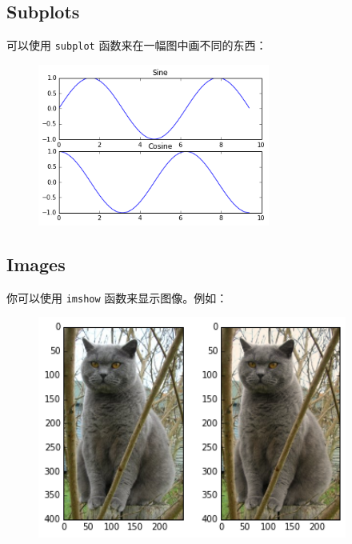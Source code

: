 \subsection{Subplots}


可以使用 \lstinline|subplot| 函数来在一幅图中画不同的东西：  



\begin{figure}[htbp]
        \centering
        \includegraphics[width=3in]{images/sine_cosine_subplot.png}
\end{figure}


\subsection{Images}

你可以使用 \lstinline|imshow| 函数来显示图像。例如： 


\begin{figure}[htbp]
        \centering
        \includegraphics[width=4in]{images/cat_tinted_imshow.png}
\end{figure}
